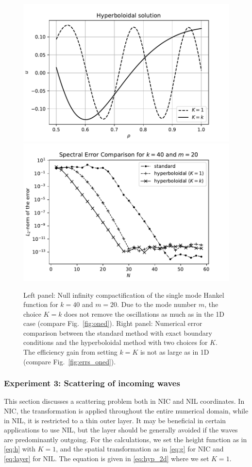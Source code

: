 \documentclass[draft,onefignum,onetabnum]{siamart190516}
\begin{document}
\begin{figure}[tbhp]
	\centering
	\includegraphics[scale=0.4]{figs/hyp_twod}
	\includegraphics[scale=0.4]{figs/sp_err_2d}
	\caption{Left panel: Null infinity compactification of the single mode Hankel function for $k=40$ and $m=20$. Due to the mode number $m$, the choice $K=k$ does not remove the oscillations as much as in the 1D case (compare Fig.~\ref{fig:oned}). Right panel: Numerical error comparison between the standard method with exact boundary conditions and the hyperboloidal method with two choices for $K$. The efficiency gain from setting $k=K$ is not as large as in 1D (compare Fig.~\ref{fig:errs_oned}). }
	\label{fig:twod}
\end{figure}



\subsubsection{Experiment 3: Scattering of incoming waves}
This section discusses a scattering problem both in NIC and NIL coordinates. In NIC, the transformation is applied throughout the entire numerical domain, while in NIL, it is restricted to a thin outer layer.  It may be beneficial in certain applications to use NIL, but the layer should be generally avoided if the waves are predominantly outgoing. For the calculations, we set the height function as in \eqref{eq:h} with $K=1$,  and the spatial transformation as in \eqref{eq:g} for NIC and \eqref{eq:layer} for NIL. The equation is given in \eqref{eq:hyp_2d} where we set $K=1$.
\end{document}
